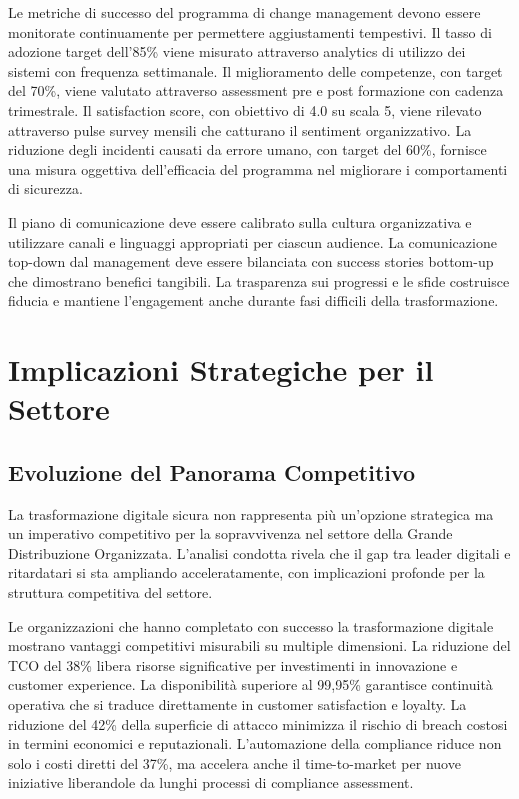 Le metriche di successo del programma di change management devono essere monitorate continuamente per permettere aggiustamenti tempestivi. Il tasso di adozione target dell'85\% viene misurato attraverso analytics di utilizzo dei sistemi con frequenza settimanale. Il miglioramento delle competenze, con target del 70\%, viene valutato attraverso assessment pre e post formazione con cadenza trimestrale. Il satisfaction score, con obiettivo di 4.0 su scala 5, viene rilevato attraverso pulse survey mensili che catturano il sentiment organizzativo. La riduzione degli incidenti causati da errore umano, con target del 60\%, fornisce una misura oggettiva dell'efficacia del programma nel migliorare i comportamenti di sicurezza.

Il piano di comunicazione deve essere calibrato sulla cultura organizzativa e utilizzare canali e linguaggi appropriati per ciascun audience. La comunicazione top-down dal management deve essere bilanciata con success stories bottom-up che dimostrano benefici tangibili. La trasparenza sui progressi e le sfide costruisce fiducia e mantiene l'engagement anche durante fasi difficili della trasformazione.

\section{Implicazioni Strategiche per il Settore}

\subsection{Evoluzione del Panorama Competitivo}

La trasformazione digitale sicura non rappresenta più un'opzione strategica ma un imperativo competitivo per la sopravvivenza nel settore della Grande Distribuzione Organizzata. L'analisi condotta rivela che il gap tra leader digitali e ritardatari si sta ampliando acceleratamente, con implicazioni profonde per la struttura competitiva del settore.

Le organizzazioni che hanno completato con successo la trasformazione digitale mostrano vantaggi competitivi misurabili su multiple dimensioni. La riduzione del TCO del 38\% libera risorse significative per investimenti in innovazione e customer experience. La disponibilità superiore al 99,95\% garantisce continuità operativa che si traduce direttamente in customer satisfaction e loyalty. La riduzione del 42\% della superficie di attacco minimizza il rischio di breach costosi in termini economici e reputazionali. L'automazione della compliance riduce non solo i costi diretti del 37\%, ma accelera anche il time-to-market per nuove iniziative liberandole da lunghi processi di compliance assessment.

